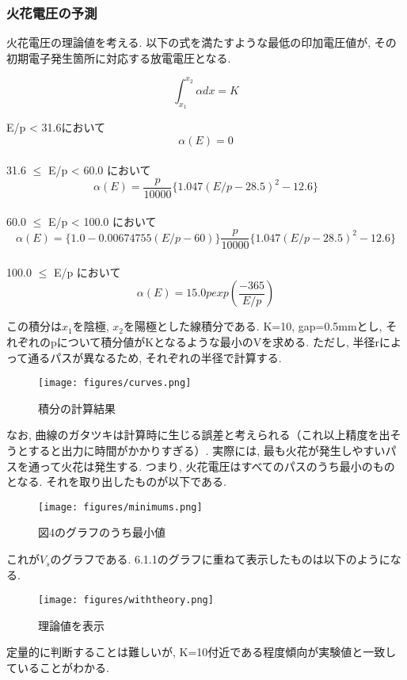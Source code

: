 \documentclass{ltjsarticle}
\begin{document}
\subsubsection{火花電圧の予測}
火花電圧の理論値を考える. 以下の式を満たすような最低の印加電圧値が, その初期電子発生箇所に対応する放電電圧となる. 

\[
\int_{x_1}^{x_2} \alpha dx = K
\]

\begin{center}
E/p < 31.6において
\[
\alpha(E) = 0
\]
\\
31.6 $\leq$ E/p < 60.0 において
\[
\alpha(E) = \frac{p}{10000} \{ 1.047 (E/p - 28.5)^2 - 12.6 \}
\]
\\
60.0 $\leq$ E/p < 100.0 において
\[
\alpha(E) = \{1.0 - 0.00674755(E/p-60)\} \frac{p}{10000} \{1.047(E/p-28.5)^2 - 12.6\} 
\]
\\
100.0 $\leq$ E/p において
\[
\alpha(E) = 15.0 p exp(\frac{-365}{E/p})    
\]
\end{center}

この積分は$x_1$を陰極, $x_2$を陽極とした線積分である. K=10, gap=0.5mmとし, それぞれのpについて積分値がKとなるような最小のVを求める. ただし, 半径rによって通るパスが異なるため, それぞれの半径で計算する. 

\begin{figure}[H]
    \begin{center}
        \texttt{[image: figures/curves.png]}
        \caption{積分の計算結果}
    \end{center}
\end{figure}

なお, 曲線のガタツキは計算時に生じる誤差と考えられる（これ以上精度を出そうとすると出力に時間がかかりすぎる）. 実際には, 最も火花が発生しやすいパスを通って火花は発生する. つまり, 火花電圧はすべてのパスのうち最小のものとなる. それを取り出したものが以下である. 

\begin{figure}[H]
    \begin{center}
        \texttt{[image: figures/minimums.png]}
        \caption{図4のグラフのうち最小値}
    \end{center}
\end{figure}

これが$V_s$のグラフである. 6.1.1のグラフに重ねて表示したものは以下のようになる. 

\begin{figure}[H]
    \begin{center}
        \texttt{[image: figures/withtheory.png]}
        \caption{理論値を表示}
    \end{center}
\end{figure}
定量的に判断することは難しいが, K=10付近である程度傾向が実験値と一致していることがわかる. 
\end{document}

